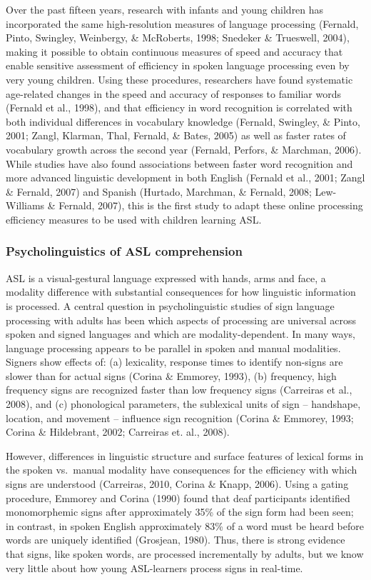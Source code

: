 \documentclass[12pt,]{article}
\begin{document}
Over the past fifteen years, research with infants and young children
has incorporated the same high-resolution measures of language
processing (Fernald, Pinto, Swingley, Weinbergy, \& McRoberts, 1998;
Snedeker \& Trueswell, 2004), making it possible to obtain continuous
measures of speed and accuracy that enable sensitive assessment of
efficiency in spoken language processing even by very young children.
Using these procedures, researchers have found systematic age-related
changes in the speed and accuracy of responses to familiar words
(Fernald et al., 1998), and that efficiency in word recognition is
correlated with both individual differences in vocabulary knowledge
(Fernald, Swingley, \& Pinto, 2001; Zangl, Klarman, Thal, Fernald, \&
Bates, 2005) as well as faster rates of vocabulary growth across the
second year (Fernald, Perfors, \& Marchman, 2006). While studies have
also found associations between faster word recognition and more
advanced linguistic development in both English (Fernald et al., 2001;
Zangl \& Fernald, 2007) and Spanish (Hurtado, Marchman, \& Fernald,
2008; Lew-Williams \& Fernald, 2007), this is the first study to adapt
these online processing efficiency measures to be used with children
learning ASL.

\subsubsection{Psycholinguistics of ASL
comprehension}\label{psycholinguistics-of-asl-comprehension}

ASL is a visual-gestural language expressed with hands, arms and face, a
modality difference with substantial consequences for how linguistic
information is processed. A central question in psycholinguistic studies
of sign language processing with adults has been which aspects of
processing are universal across spoken and signed languages and which
are modality-dependent. In many ways, language processing appears to be
parallel in spoken and manual modalities. Signers show effects of: (a)
lexicality, response times to identify non-signs are slower than for
actual signs (Corina \& Emmorey, 1993), (b) frequency, high frequency
signs are recognized faster than low frequency signs (Carreiras et al.,
2008), and (c) phonological parameters, the sublexical units of sign --
handshape, location, and movement -- influence sign recognition (Corina
\& Emmorey, 1993; Corina \& Hildebrant, 2002; Carreiras et. al., 2008).

However, differences in linguistic structure and surface features of
lexical forms in the spoken vs.~manual modality have consequences for
the efficiency with which signs are understood (Carreiras, 2010, Corina
\& Knapp, 2006). Using a gating procedure, Emmorey and Corina (1990)
found that deaf participants identified monomorphemic signs after
approximately 35\% of the sign form had been seen; in contrast, in
spoken English approximately 83\% of a word must be heard before words
are uniquely identified (Grosjean, 1980). Thus, there is strong evidence
that signs, like spoken words, are processed incrementally by adults,
but we know very little about how young ASL-learners process signs in
real-time.
\end{document}

